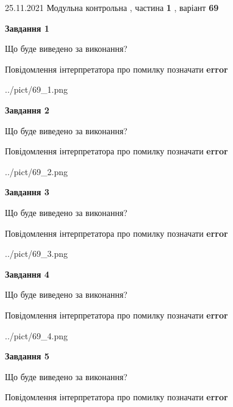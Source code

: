 \documentclass[10pt, ukrainian]{article}
\begin{document}
{25.11.2021 Модульна контрольна , частина \textbf { 1 }, варіант  \No \textbf { 69 }\par}
{
\begin {large}

{\begin {center}\textbf{Завдання 1}\end {center}}\par
Що буде виведено за виконання? \par
Повідомлення інтерпретатора про помилку позначати \textbf{error}

\begin{center}
	{../pict/69_1.png}
\end{center}
\newpage

{\begin {center}\textbf{Завдання 2}\end {center}}\par
Що буде виведено за виконання? \par
Повідомлення інтерпретатора про помилку позначати \textbf{error}

\begin{center}
	{../pict/69_2.png}
\end{center}
\newpage

{\begin {center}\textbf{Завдання 3}\end {center}}\par
Що буде виведено за виконання? \par
Повідомлення інтерпретатора про помилку позначати \textbf{error}

\begin{center}
	{../pict/69_3.png}
\end{center}
\newpage

{\begin {center}\textbf{Завдання 4}\end {center}}\par
Що буде виведено за виконання? \par
Повідомлення інтерпретатора про помилку позначати \textbf{error}

\begin{center}
	{../pict/69_4.png}
\end{center}
\newpage

{\begin {center}\textbf{Завдання 5}\end {center}}\par
Що буде виведено за виконання? \par
Повідомлення інтерпретатора про помилку позначати \textbf{error}


\end{large}}
\end{document}
